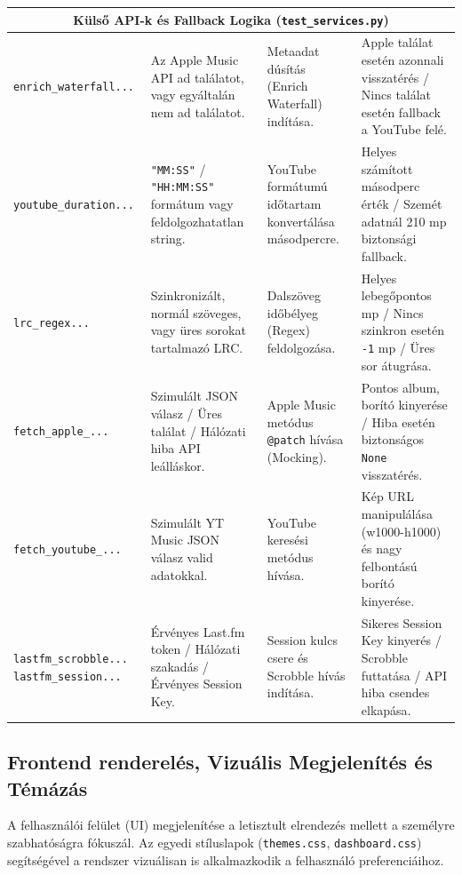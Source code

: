 \begin{longtable}{|p{3.2cm}|p{3.6cm}|p{3.2cm}|p{4cm}|}
    \multicolumn{4}{|c|}{\textbf{Külső API-k és Fallback Logika (\texttt{test\_services.py})}} \\ \hline
    \texttt{enrich\_waterfall...} & Az Apple Music API ad találatot, vagy egyáltalán nem ad találatot. & Metaadat dúsítás (Enrich Waterfall) indítása. & Apple találat esetén azonnali visszatérés / Nincs találat esetén fallback a YouTube felé. \\ \hline
    \texttt{youtube\_duration...} & \texttt{"MM:SS"} / \texttt{"HH:MM:SS"} formátum vagy feldolgozhatatlan string. & YouTube formátumú időtartam konvertálása másodpercre. & Helyes számított másodperc érték / Szemét adatnál 210 mp biztonsági fallback. \\ \hline
    \texttt{lrc\_regex...} & Szinkronizált, normál szöveges, vagy üres sorokat tartalmazó LRC. & Dalszöveg időbélyeg (Regex) feldolgozása. & Helyes lebegőpontos mp / Nincs szinkron esetén \texttt{-1} mp / Üres sor átugrása. \\ \hline
    \texttt{fetch\_apple\_...} & Szimulált JSON válasz / Üres találat / Hálózati hiba API leálláskor. & Apple Music metódus \texttt{@patch} hívása (Mocking). & Pontos album, borító kinyerése / Hiba esetén biztonságos \texttt{None} visszatérés. \\ \hline
    \texttt{fetch\_youtube\_...} & Szimulált YT Music JSON válasz valid adatokkal. & YouTube keresési metódus hívása. & Kép URL manipulálása (w1000-h1000) és nagy felbontású borító kinyerése. \\ \hline
    \texttt{lastfm\_scrobble...} \newline \texttt{lastfm\_session...} & Érvényes Last.fm token / Hálózati szakadás / Érvényes Session Key. & Session kulcs csere és Scrobble hívás indítása. & Sikeres Session Key kinyerés / Scrobble futtatása / API hiba csendes elkapása. \\ \hline

\end{longtable}

\subsection{Frontend renderelés, Vizuális Megjelenítés és Témázás}
A felhasználói felület (UI) megjelenítése a letisztult elrendezés mellett a személyre szabhatóságra fókuszál. Az egyedi stíluslapok (\texttt{themes.css}, \texttt{dashboard.css}) segítségével a rendszer vizuálisan is alkalmazkodik a felhasználó preferenciáihoz.

